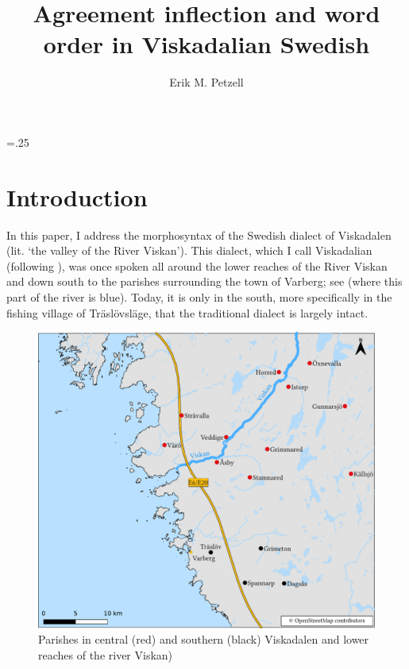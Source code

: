 \documentclass[output=paper,colorlinks,citecolor=brown,draft,draftmode]{langscibook}
\author{Erik M. Petzell\orcid{}\affiliation{Institute for Language and Folklore, Gothenburg}}
\title{Agreement inflection and word order in Viskadalian Swedish}
\begin{document}
\multicolsep=.25\baselineskip
\maketitle


\section{Introduction}\label{sec:petzell:1}


In this paper, I address the morphosyntax of the Swedish dialect of Viskadalen (lit. ‘the valley of the River Viskan’). This dialect, which I call Viskadalian (following \citealt{Petzell2017}), was once spoken all around the lower reaches of the River Viskan and down south to the parishes surrounding the town of Varberg; see  (where this part of the river is blue). Today, it is only in the south, more specifically in the fishing village of Träslövsläge, that the traditional dialect is largely intact. 

\begin{figure}
\includegraphics[width=\textwidth]{figures/lmswe-latest-compressed.pdf}
\caption{\label{figmap:petzell:1}\label{figmap:petzell:2}Parishes in central (red) and southern (black) Viskadalen and lower reaches of the river Viskan)}
\end{figure}
\end{document}
